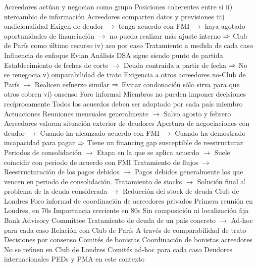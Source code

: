 \documentclass{nuevotema}
\begin{document}
\begin{esquemal}
				\4[] Acreedores actúan y negocian como grupo
				\4[] Posiciones coherentes entre sí
				\4[] ii) ntercambio de información
				\4[] Acreedores comparten datos y previsiones
				\4[] iii) ondicionalidad
				\4[] Exigen de deudor
				\4[] $\to$ tenga acuerdo con FMI
				\4[] $\to$ haya agotado oportunidades de financiación
				\4[] $\to$ no pueda realizar más ajuste interno
				\4[] $\Rightarrow$ Club de París como último recurso
				\4[] iv) aso por caso
				\4[] Tratamiento a medida de cada caso
				\4[] Influencia de enfoque Evian
				\4[] Análisis DSA sigue siendo punto de partida
				\4[] Establecimiento de fechas de corte
				\4[] $\to$ Deuda contraída a partir de fecha
				\4[] $\Rightarrow$ No se renegocia
				\4[] v) omparabilidad de trato
				\4[] Exigencia a otros acreedores no-Club de París
				\4[] $\to$ Realicen esfuerzo similar
				\4[] $\Rightarrow$ Evitar condonación sólo sirva para que otros cobren
				\4[] vi) onsenso
				\4[] Foro informal
				\4[] Miembros no pueden imponer decisiones recíprocamente
				\4[] Todos los acuerdos deben ser adoptado por cada país miembro
				\4 Actuaciones
				\4[] Reuniones mensuales generalmente
				\4[] $\to$ Salvo agosto y febrero
				\4[] Acreedores valoran situación exterior de deudores
				\4[] Apertura de negociaciones con deudor
				\4[] $\to$ Cuando ha alcanzado acuerdo con FMI
				\4[] $\to$ Cuando ha demostrado incapacidad para pagar
				\4[] $\Rightarrow$ Tiene un financing gap susceptible de reestructurar
				\4[] Periodos de consolidación
				\4[] $\to$ Etapa en la que se aplica acuerdo
				\4[] $\to$ Suele coincidir con periodo de acuerdo con FMI
				\4[] Tratamiento de flujos
				\4[] $\to$ Reestructuración de los pagos debidos
				\4[] $\to$ Pagos debidos generalmente los que vencen en periodo de consolidación.
				\4[] Tratamiento de stocks
				\4[] $\to$ Solución final al problema de la deuda considerada
				\4[] $\to$ Reducción del stock de deuda
			\3 Club de Londres
				\4 Foro informal de coordinación de acreedores privados
				\4[] Primera reunión en Londres, en 70s
				\4[] Importancia creciente en 80s
				\4 Sin composición ni localización fija
				\4 Bank Advisory Committee
				\4[] Tratamiento de deuda de un país concreto
				\4[] $\to$ Ad-hoc para cada caso
				\4 Relación con Club de París
				\4[] A través de comparabilidad de trato
				\4 Decisiones por consenso
			\3 Comités de bonistas
				\4 Coordinación de bonistas acreedores
				\4 No se reúnen en Club de Londres
				\4 Comités ad-hoc para cada caso
			\3 Deudores internacionales
				\4 PEDs y PMA en este contexto

\end{esquemal}
\end{document}
